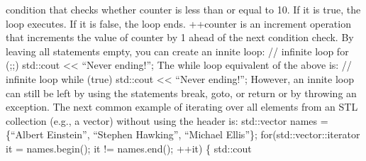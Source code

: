 condition that checks whether counter is less than or equal to 10. If it
is true, the loop executes. If it is false, the loop ends. ++counter is
an increment operation that increments the value of counter by 1 ahead
of the next condition check. By leaving all statements empty, you can
create an innite loop: // infinite loop for (;;) std::cout
\textless\textless{} ``Never ending!\n''; The while loop equivalent of
the above is: // infinite loop while (true) std::cout
\textless\textless{} ``Never ending!\n''; However, an innite loop can
still be left by using the statements break, goto, or return or by
throwing an exception. The next common example of iterating over all
elements from an STL collection (e.g., a vector) without using the
header is: std::vector names = \{``Albert Einstein'', ``Stephen
Hawking'', ``Michael Ellis''\}; for(std::vector::iterator it =
names.begin(); it != names.end(); ++it) \{ std::cout
